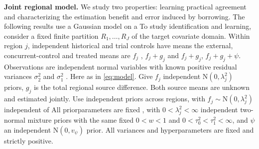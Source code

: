 \documentclass[11pt]{article}
\newcommand{\N}{\mathrm{N}}
\theoremstyle{remark}\newtheorem{remark}{Remark}[section]
\providecommand{\DIFaddtex}[1]{{\protect\color{blue} \sf #1}} %
\providecommand{\DIFdeltex}[1]{{\protect\color{red} \scriptsize #1}} %
\providecommand{\DIFaddbegin}{} %
\providecommand{\DIFaddend}{} %
\providecommand{\DIFdelbegin}{} %
\providecommand{\DIFdelend}{} %
\providecommand{\DIFadd}[1]{\texorpdfstring{\DIFaddtex{#1}}{#1}} %
\providecommand{\DIFdel}[1]{\texorpdfstring{\DIFdeltex{#1}}{}} %
\begin{document}
\DIFdelbegin %
\DIFdel{\textbf{Joint regional model.}
We study two properties: learning practical agreement and characterizing the estimation benefit and error induced by borrowing. The following results use a Gaussian model on a }\DIFdelend \DIFaddbegin \DIFadd{To study identification and learning, consider a }\DIFaddend fixed finite partition $R_1,\ldots,R_J$\DIFdelbegin \DIFdel{of the target covariate domain}\DIFdelend . Within region $j$, \DIFdelbegin \DIFdel{independent historical and trial controls have means }\DIFdelend \DIFaddbegin \DIFadd{the external, concurrent-control and treated means are }\DIFaddend $f_j$\DIFaddbegin \DIFadd{, $f_j+g_j$ }\DIFaddend and \DIFdelbegin \DIFdel{$f_j+g_j$, }\DIFdelend \DIFaddbegin \DIFadd{$f_j+g_j+\psi$. Observations are independent normal variables }\DIFaddend with known positive \DIFdelbegin \DIFdel{residual }\DIFdelend variances $\sigma_2^2$ and $\sigma_1^2$ \DIFdelbegin \DIFdel{. Here }\DIFdelend \DIFaddbegin \DIFadd{as in \eqref{eq:model}. Give $f_j$ independent $\N(0,\lambda_j^2)$ priors, }\DIFaddend $g_j$ \DIFdelbegin \DIFdel{is the total regional source difference. Both source means are unknown and estimated jointly. Use independent priors across regions, with $f_j\sim\N(0,\lambda_j^2)$ independent of
}%
\DIFdel{All priorparameters are fixed , with $0<\lambda_j^2<\infty$}\DIFdelend \DIFaddbegin \DIFadd{independent two-normal mixture priors with the same fixed $0<w<1$ and $0<\tau_0^2<\tau_1^2<\infty$, and $\psi$ an independent $\N(0,v_\psi)$ prior. All variances and hyperparameters are fixed and strictly positive}\DIFaddend .
\end{document}
